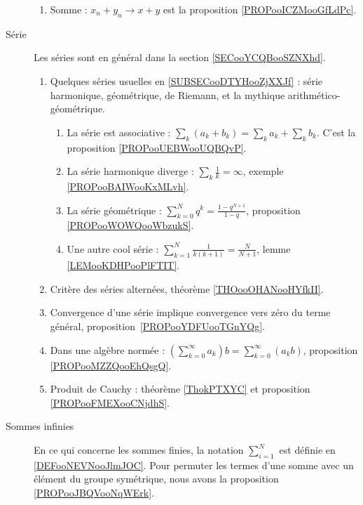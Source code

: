 \begin{description}
\begin{enumerate}
			\item
			      Somme : \( x_n+y_n\to x+y\) est la proposition \ref{PROPooICZMooGfLdPc}.
		\end{enumerate}
	\item[Série]
		Les séries sont en général dans la section \ref{SECooYCQBooSZNXhd}.
		\begin{enumerate}
			\item
			      Quelques séries usuelles en \ref{SUBSECooDTYHooZjXXJf} : série harmonique, géométrique, de Riemann, et la mythique arithmético-géométrique.
			      \begin{enumerate}
				      \item
				            La série est associative : \( \sum_k(a_k+b_k)=\sum_ka_k+\sum_kb_k\). C'est la proposition \ref{PROPooUEBWooUQBQvP}.
				      \item
				            La série harmonique diverge : \( \sum_k\frac{1}{ k }=\infty\), exemple \ref{PROPooBAIWooKxMLvh}.
				      \item
				            La série géométrique : \( \sum_{k=0}^Nq^k=\frac{ 1-q^{N+1} }{ 1-q }\), proposition \ref{PROPooWOWQooWbzukS}.
				      \item
				            Une autre cool série : \( \sum_{k=1}^N\frac{ 1 }{ k(k+1) }=\frac{ N }{ N+1 }\), lemme \ref{LEMooKDHPooPlFTIT}.
			      \end{enumerate}
			\item
			      Critère des séries alternées, théorème \ref{THOooOHANooHYfkII}.
			\item
			      Convergence d'une série implique convergence vers zéro du terme général, proposition~\ref{PROPooYDFUooTGnYQg}.
			\item
			      Dans une algèbre normée : \( (\sum_{k=0}^{\infty}a_k)b=\sum_{k=0}^{\infty}(a_kb)\), proposition \ref{PROPooMZZQooEhQsgQ}.
			\item
			      Produit de Cauchy : théorème \ref{ThokPTXYC} et proposition \ref{PROPooFMEXooCNjdhS}.
		\end{enumerate}

	\item[Sommes infinies]
		En ce qui concerne les sommes finies, la notation \( \sum_{i=1}^N\) est définie en \ref{DEFooNEVNooJlmJOC}. Pour permuter les termes d'une somme avec un élément du groupe symétrique, nous avons la proposition \ref{PROPooJBQVooNqWErk}.


\end{description}
